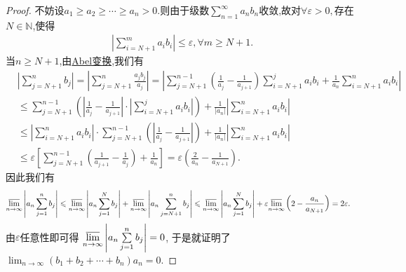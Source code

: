 \documentclass[../../main.tex]{subfiles}%
\begin{document}
\begin{proof}

不妨设\(a_1 \geqslant a_2 \geqslant \cdots \geqslant a_n > 0\).则由于级数\(\sum\limits_{n = 1}^{\infty} a_n b_n\)收敛,故对$\forall \varepsilon >0,$存在\(N \in \mathbb{N}\),使得
\begin{align*}
\left|\sum\limits_{i = N + 1}^{m} a_i b_i\right| \leqslant \varepsilon, \forall m \geqslant N + 1.
\end{align*}
当\(n \geqslant N + 1\),由\hyperref[theorem:Abel变换]{Abel变换},我们有
\begin{align*}
&\left|\sum\limits_{j = N + 1}^{n} b_j\right| = \left|\sum\limits_{j = N + 1}^{n} \frac{a_j b_j}{a_j}\right|
= \left|\sum\limits_{j = N + 1}^{n - 1} \left(\frac{1}{a_j} - \frac{1}{a_{j + 1}}\right) \sum\limits_{i = N + 1}^{j} a_i b_i + \frac{1}{a_n} \sum\limits_{i = N + 1}^{n} a_i b_i\right|
\\
&\leqslant \sum\limits_{j = N + 1}^{n - 1} \left(\left|\frac{1}{a_j} - \frac{1}{a_{j + 1}}\right| \cdot \left|\sum\limits_{i = N + 1}^{j} a_i b_i\right|\right) + \frac{1}{|a_n|} \left|\sum\limits_{i = N + 1}^{n} a_i b_i\right|
\\
&\leqslant \left|\sum\limits_{i = N + 1}^{n} a_i b_i\right|\cdot\sum\limits_{j = N + 1}^{n - 1} \left(\left|\frac{1}{a_j} - \frac{1}{a_{j + 1}}\right| \right) + \frac{1}{|a_n|} \left|\sum\limits_{i = N + 1}^{n} a_i b_i\right|
\\
&\leqslant \varepsilon \left[\sum\limits_{j = N + 1}^{n - 1} \left(\frac{1}{a_{j + 1}} - \frac{1}{a_j}\right) + \frac{1}{a_n}\right]
= \varepsilon \left(\frac{2}{a_n} - \frac{1}{a_{N + 1}}\right).
\end{align*}
因此我们有
\begin{align*}
&\underset{n\rightarrow \infty}{{\varlimsup }} \left|a_n \sum\limits_{j = 1}^{n} b_j\right| \leqslant \underset{n\rightarrow \infty}{{\varlimsup }} \left|a_n \sum\limits_{j = 1}^{N} b_j\right| + \underset{n\rightarrow \infty}{{\varlimsup }} \left|a_n \sum\limits_{j = N + 1}^{n} b_j\right|
\leqslant \underset{n\rightarrow \infty}{{\varlimsup }} \left|a_n \sum\limits_{j = 1}^{N} b_j\right| + \varepsilon \underset{n\rightarrow \infty}{{\varlimsup }} \left(2 - \frac{a_n}{a_{N + 1}}\right)= 2\varepsilon.
\end{align*}
由\(\varepsilon\)任意性即可得
\(\underset{n\rightarrow \infty}{{\varlimsup }} \left|a_n \sum\limits_{j = 1}^{n} b_j\right| = 0\),
于是就证明了
\(\lim_{n \to \infty} (b_1 + b_2 + \cdots + b_n)a_n = 0\).

\end{proof}
\end{document}
